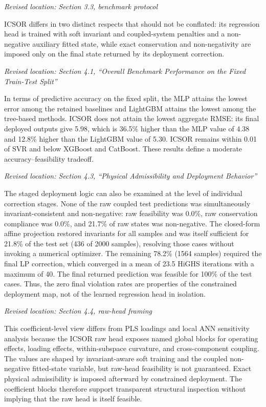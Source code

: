 \documentclass[11pt,a4paper]{article}
\newcommand{\excerptlocation}[1]{\par\noindent\textit{Revised location: #1}\par}
\begin{document}
\excerptlocation{Section 3.3, benchmark protocol}
\begin{revisionexcerpt}
ICSOR differs in two distinct respects that should not be conflated: its regression head is trained with soft invariant and coupled-system penalties and a non-negative auxiliary fitted state, while exact conservation and non-negativity are imposed only on the final state returned by its deployment correction.
\end{revisionexcerpt}

\excerptlocation{Section 4.1, ``Overall Benchmark Performance on the Fixed Train-Test Split''}
\begin{revisionexcerpt}
In terms of predictive accuracy on the fixed split, the MLP attains the lowest error among the retained baselines and LightGBM attains the lowest among the tree-based methods. ICSOR does not attain the lowest aggregate RMSE: its final deployed outputs give 5.98, which is 36.5\% higher than the MLP value of 4.38 and 12.8\% higher than the LightGBM value of 5.30. ICSOR remains within 0.01 of SVR and below XGBoost and CatBoost. These results define a moderate accuracy--feasibility tradeoff.
\end{revisionexcerpt}

\excerptlocation{Section 4.3, ``Physical Admissibility and Deployment Behavior''}
\begin{revisionexcerpt}
The staged deployment logic can also be examined at the level of individual correction stages. None of the raw coupled test predictions was simultaneously invariant-consistent and non-negative: raw feasibility was 0.0\%, raw conservation compliance was 0.0\%, and 21.7\% of raw states was non-negative. The closed-form affine projection restored invariants for all samples and was itself sufficient for 21.8\% of the test set (436 of 2000 samples), resolving those cases without invoking a numerical optimizer. The remaining 78.2\% (1564 samples) required the final LP correction, which converged in a mean of 23.5 HiGHS iterations with a maximum of 40. The final returned prediction was feasible for 100\% of the test cases. Thus, the zero final violation rates are properties of the constrained deployment map, not of the learned regression head in isolation.
\end{revisionexcerpt}

\excerptlocation{Section 4.4, raw-head framing}
\begin{revisionexcerpt}
This coefficient-level view differs from PLS loadings and local ANN sensitivity analysis because the ICSOR raw head exposes named global blocks for operating effects, loading effects, within-subspace curvature, and cross-component coupling. The values are shaped by invariant-aware soft training and the coupled non-negative fitted-state variable, but raw-head feasibility is not guaranteed. Exact physical admissibility is imposed afterward by constrained deployment. The coefficient blocks therefore support transparent structural inspection without implying that the raw head is itself feasible.
\end{revisionexcerpt}
\end{document}
